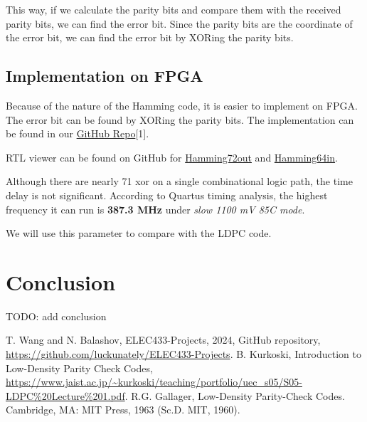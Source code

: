\documentclass[conference]{IEEEtran}
\begin{document}
This way, if we calculate the parity bits and compare them with the received
parity bits, we can find the error bit. Since the parity bits are the
coordinate of the error bit, we can find the error bit by XORing the parity
bits.
\subsection{Implementation on FPGA}
Because of the nature of the Hamming code, it is easier to implement on FPGA.
The error bit can be found by XORing the parity bits. The implementation can be
found in our \href{https://github.com/luckunately/ELEC433-Projects}{GitHub
  Repo}[1]. %

  RTL viewer can be found on GitHub for \href{https://github.com/luckunately/ELEC433-Projects/blob/add-tex/Hamming72out/Hamming72out_RTL.pdf}{Hamming72out} and \href{https://github.com/luckunately/ELEC433-Projects/blob/add-tex/Hamming64in/Hamming64inRTL.pdf}{Hamming64in}.

Although there are nearly 71 xor on a single combinational logic path, the time
delay is not significant. According to Quartus timing analysis, the highest
frequency it can run is \textbf{387.3 MHz} under \textit{slow 1100 mV 85C
  mode}.

We will use this parameter to compare with the LDPC code.

\section{Conclusion}
TODO: add conclusion

\begin{thebibliography}{00}
   T. Wang and N. Balashov, ELEC433-Projects, 2024, GitHub repository, \url{https://github.com/luckunately/ELEC433-Projects}.
   B. Kurkoski, Introduction to Low-Density Parity Check Codes, \url{https://www.jaist.ac.jp/~kurkoski/teaching/portfolio/uec_s05/S05-LDPC%20Lecture%201.pdf}.
   R.G. Gallager, Low-Density Parity-Check Codes. Cambridge, MA: MIT Press, 1963 (Sc.D. MIT, 1960).
\end{thebibliography}
\end{document}
